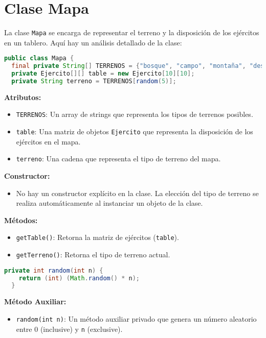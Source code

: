 \section{Clase Mapa}

La clase \texttt{Mapa} se encarga de representar el terreno y la disposición de los ejércitos en un tablero. Aquí hay un análisis detallado de la clase:

\begin{lstlisting}[language=Java]
public class Mapa {
  final private String[] TERRENOS = {"bosque", "campo", "montaña", "desierto", "playa"};
  private Ejercito[][] table = new Ejercito[10][10];
  private String terreno = TERRENOS[random(5)];
\end{lstlisting}

\textbf{Atributos:}
\begin{itemize}
  \item \texttt{TERRENOS}: Un array de strings que representa los tipos de terrenos posibles.
  \item \texttt{table}: Una matriz de objetos \texttt{Ejercito} que representa la disposición de los ejércitos en el mapa.
  \item \texttt{terreno}: Una cadena que representa el tipo de terreno del mapa.
\end{itemize}

\textbf{Constructor:}
\begin{itemize}
  \item No hay un constructor explícito en la clase. La elección del tipo de terreno se realiza automáticamente al instanciar un objeto de la clase.
\end{itemize}

\textbf{Métodos:}
\begin{itemize}
  \item \texttt{getTable()}: Retorna la matriz de ejércitos (\texttt{table}).
  \item \texttt{getTerreno()}: Retorna el tipo de terreno actual.
\end{itemize}

\begin{lstlisting}[language=Java]
  private int random(int n) {
    return (int) (Math.random() * n);
  }
\end{lstlisting}

\textbf{Método Auxiliar:}
\begin{itemize}
  \item \texttt{random(int n)}: Un método auxiliar privado que genera un número aleatorio entre 0 (inclusive) y \texttt{n} (exclusive).
\end{itemize}

